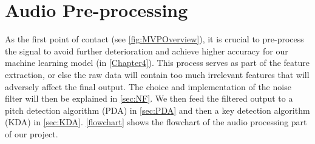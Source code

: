 \chapter{Audio Pre-processing} %
\label{Chapter5} %
As the first point of contact (see \cref{fig:MVPOverview}), it is crucial to pre-process the signal to avoid further deterioration
and achieve higher accuracy for our machine learning model (in \cref{Chapter4}). This process serves as part of the feature extraction, or else the raw data will contain too much irrelevant features that will adversely affect the final output. 
The choice and implementation of the noise filter will then be explained in \cref{sec:NF}. We then feed the filtered output 
to a pitch detection algorithm (PDA) in \cref{sec:PDA} and then a key detection algorithm (KDA) in \cref{sec:KDA}.
\cref{flowchart} shows the flowchart of the audio processing part of our project.

        
        


